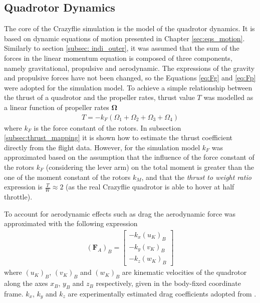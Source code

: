 \documentclass[11pt, a4paper, twoside]{report}
\begin{document}
\subsection{Quadrotor Dynamics} \label{subsec:quadrotor_dynamics}

The core of the Crazyflie simulation is the model of the quadrotor dynamics. It is based on dynamic equations of motion presented in Chapter \ref{sec:eqs_motion}. Similarly to section \ref{subsec: indi_outer}, it was assumed that the sum of the forces in the linear momentum equation is composed of three components, namely gravitational, propulsive and aerodynamic. The expressions of the gravity and propulsive forces have not been changed, so the Equations \ref{eq:Fg} and \ref{eq:Fp} were adopted for the simulation model. To achieve a simple relationship between the thrust of a quadrotor and the propeller rates, thrust value $T$ was modelled as a linear function of propeller rates $\bm{\Omega}$ 
\begin{equation}
	\begin{split}
		T = - k_F (\Omega_1 + \Omega_2 + \Omega_3 + \Omega_4)
		\label{eq:thrust}
	\end{split}
\end{equation}
where $k_F$ is the force constant of the rotors. In subsection \ref{subsec:thrust_mapping} it is shown how to estimate the thrust coefficient directly from the flight data. However, for the simulation model $k_F$ was approximated based on the assumption that the influence of the force constant of the rotors $k_F$ (considering the lever arm) on the total moment is greater than the one of the moment constant of the rotors $k_M$, and that the \textit{thrust to weight ratio} expression is $\frac{T}{W} \approx 2$ (as the real Crazyflie quadrotor is able to hover at half throttle).

To account for aerodynamic effects such as drag the aerodynamic force was approximated with the following expression 
\begin{equation}
	\begin{split}
		(\bm{F}_A)_B =  
		\begin{bmatrix}
			-k_x (u_K)_B\\
			-k_y (v_K)_B\\
			-k_z (w_K)_B
		\end{bmatrix}
		\label{eq:Fa_simulink}
	\end{split}
\end{equation}
where $(u_K)_B$, $(v_K)_B$ and $(w_K)_B$ are kinematic velocities of the quadrotor along the axes $x_B$, $y_B$ and $z_B$ respectively, given in the body-fixed coordinate frame. $k_x$, $k_y$ and $k_z$ are experimentally estimated drag coefficients adopted from \cite{foerster}.
\end{document}
